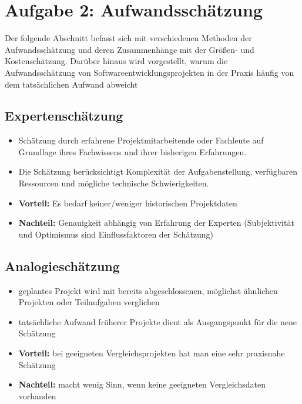 \documentclass[a4paper,10pt]{article}
\begin{document}
        \section*{Aufgabe 2: Aufwandsschätzung}

        Der folgende Abschnitt befasst sich mit verschiedenen Methoden der Aufwandsschätzung und deren Zusammenhänge mit der Grö\ss{}en- und Kostenschätzung.
    Darüber hinaus wird vorgestellt, warum die Aufwandsschätzung von Softwareentwicklungsprojekten in der Praxis häufig von dem tatsächlichen Aufwand abweicht\par

\subsection*{Expertenschätzung}
        \begin{itemize}
            \item Schätzung durch erfahrene Projektmitarbeitende oder Fachleute auf Grundlage ihres Fachwissens und ihrer bisherigen Erfahrungen.
            \item Die Schätzung berücksichtigt Komplexität der Aufgabenstellung, verfügbaren Ressourcen und mögliche technische Schwierigkeiten.
            \item \textbf{Vorteil:} Es bedarf keiner/weniger historischen Projektdaten
            \item \textbf{Nachteil:} Genauigkeit abhängig von Erfahrung der Experten (Subjektivität und Optimismus sind Einflussfaktoren der Schätzung)
        \end{itemize}

        \subsection*{Analogieschätzung}
        \begin{itemize}
            \item geplantes Projekt wird mit bereits abgeschlossenen, möglichst ähnlichen Projekten oder Teilaufgaben verglichen
            \item tatsächliche Aufwand früherer Projekte dient als Ausgangspunkt für die neue Schätzung
            \item \textbf{Vorteil:} bei geeigneten Vergleichsprojekten hat man eine sehr praxisnahe Schätzung
            \item \textbf{Nachteil:} macht wenig Sinn, wenn keine geeigneten Vergleichsdaten vorhanden
        \end{itemize}
\end{document}
